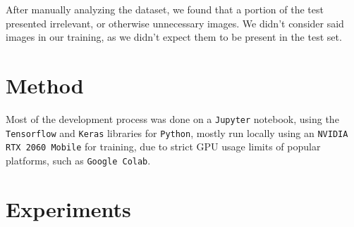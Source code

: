 \documentclass[11pt]{article}
\begin{document}
\begin{multicols}{2}

      After manually analyzing the dataset, we found that a portion of the test presented irrelevant, or otherwise unnecessary images. We didn't consider said images in our training, as we didn't expect them to be present in the test set.

      \section{Method}



      Most of the development process was done on a \texttt{Jupyter} notebook, using the \texttt{Tensorflow}\cite{TensorFlow} and \texttt{Keras}\cite{chollet2015keras} libraries for \texttt{Python}, mostly run locally using an \texttt{NVIDIA RTX 2060 Mobile} for training, due to strict GPU usage limits of popular platforms, such as \texttt{Google Colab}.

      \label{sec:experiments}
      \section{Experiments}


\end{multicols}
\end{document}
